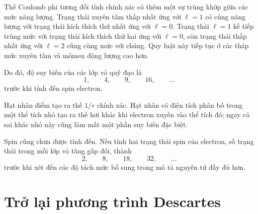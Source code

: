 Thế Coulomb phi tương đối tính chính xác có thêm một sự trùng khớp giữa các mức năng lượng. Trạng thái xuyên tâm thấp nhất ứng với \(\ell=1\) có cùng năng lượng với trạng thái kích thích thứ nhất ứng với \(\ell=0\). Trạng thái \(\ell=1\) kế tiếp trùng mức với trạng thái kích thích thứ hai ứng với \(\ell=0\), còn trạng thái thấp nhất ứng với \(\ell=2\) cũng cùng mức với chúng. Quy luật này tiếp tục ở các tháp mức xuyên tâm và mômen động lượng cao hơn.

\begin{classroomqa}\end{classroomqa}

Do đó, độ suy biến của các lớp vỏ quỹ đạo là
\begin{equation}
1,\qquad 4,\qquad 9,\qquad 16,\qquad \ldots
\end{equation}
trước khi tính đến spin electron.

\begin{classroomqa}\end{classroomqa}

Hạt nhân điểm tạo ra thế \(1/r\) chính xác. Hạt nhân có điện tích phân bố trong một thể tích nhỏ tạo ra thế hơi khác khi electron xuyên vào thể tích đó; ngay cả sai khác nhỏ này cũng làm mất một phần suy biến đặc biệt.

Spin cũng chưa được tính đến. Nếu tính hai trạng thái spin của electron, số trạng thái trong mỗi lớp vỏ tăng gấp đôi, thành
\begin{equation}
2,\qquad 8,\qquad 18,\qquad 32,\qquad \ldots
\end{equation}
trước khi xét đến các độ tách mức bổ sung trong mô tả nguyên tử đầy đủ hơn.

\section{Trở lại phương trình Descartes}

